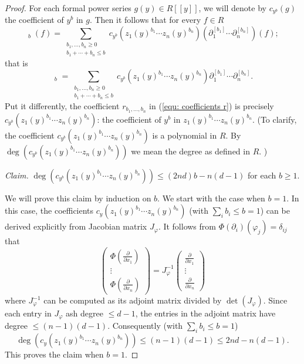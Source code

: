 \documentclass[11pt]{amsart}
\theoremstyle{definition}
\theoremstyle{remark}
\numberwithin{equation}{subsection}
\DeclareMathOperator{\tp}{\tilde{\partial}}
\begin{document}
\begin{proof}
For each formal power series $g(y)\in R[[y]]$, we will denote by $c_{y^b}(g)$ the coefficient of $y^b$ in $g$. Then it follows that for every $f\in R$
\[\tp_{b}(f)=\sum_{\substack{b_1,\dots,b_n\geq 0\\ b_1+\cdots+b_n\leq b}}c_{y^b}(z_1(y)^{b_1}\cdots z_n(y)^{b_n})(\partial^{[b_1]}_1\cdots \partial^{[b_n]}_n)(f);\]
that is
\begin{equation}
\label{equ: coefficient}
\tp_{b}=\sum_{\substack{b_1,\dots,b_n\geq 0\\ b_1+\cdots+b_n\leq b}}c_{y^b}(z_1(y)^{b_1}\cdots z_n(y)^{b_n})\partial^{[b_1]}_1\cdots \partial^{[b_n]}_n.
\end{equation}
Put it differently, the coefficient $r_{b_1,\dots,b_n}$ in (\ref{equ: coefficients r}) is precisely $c_{y^b}(z_1(y)^{b_1}\cdots z_n(y)^{b_n})$: the coefficient of $y^b$ in $z_1(y)^{b_1}\cdots z_n(y)^{b_n}$. (To clarify, the coefficient $c_{y^b}(z_1(y)^{b_1}\cdots z_n(y)^{b_n})$ is a polynomial in $R$. By $\deg(c_{y^b}(z_1(y)^{b_1}\cdots z_n(y)^{b_n}))$ we mean the degree as defined in $R$. )

{\it Claim.} $\deg(c_{y^b}(z_1(y)^{b_1}\cdots z_n(y)^{b_n}))\leq (2nd)b-n(d-1)$ for each $b\geq 1$.

We will prove this claim by induction on $b$. We start with the case when $b=1$. In this case, the coefficients $c_{y}(z_1(y)^{b_1}\cdots z_n(y)^{b_n})$ (with $\sum_ib_i\leq b=1$) can be derived explicitly from Jacobian matrix $J_{\varphi}$. It follows from $\Phi(\partial_i)(\varphi_j)=\delta_{ij}$ that
\begin{equation}
\label{image of derivatives}
\begin{pmatrix}\Phi(\frac{\partial}{\partial x_1})\\ \vdots \\ \Phi(\frac{\partial}{\partial x_n}) \end{pmatrix}=J^{-1}_{\varphi}\begin{pmatrix}\frac{\partial}{\partial x_1}\\ \vdots \\ \frac{\partial}{\partial x_n}\end{pmatrix}
\end{equation}
where $J^{-1}_{\varphi}$ can be computed as its adjoint matrix divided by $\det(J_{\varphi})$. Since each entry in $J_{\varphi}$ ash degree $\leq d-1$, the entries in the adjoint matrix have degree $\leq (n-1)(d-1)$. Consequently (with $\sum_ib_i\leq b=1$)
\[\deg(c_{y}(z_1(y)^{b_1}\cdots z_n(y)^{b_n}))\leq (n-1)(d-1)\leq 2nd-n(d-1).\]
This proves the claim when $b=1$.


\end{proof}
\end{document}

